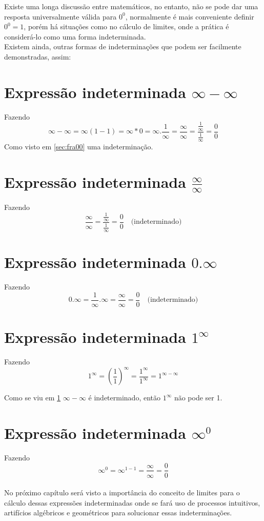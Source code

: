 Existe uma longa discussão entre matemáticos, no entanto, não se pode dar uma resposta universalmente válida para $0^0$, normalmente é mais conveniente definir $0^0 = 1$, porém há situações como no cálculo de limites, onde a prática é considerá-lo como uma forma indeterminada.\\

Existem ainda, outras formas de indeterminações que podem ser facilmente demonstradas, assim:
\section{Expressão indeterminada $\infty -  \infty$}
\label{sec:infinf}
Fazendo 
$$\infty - \infty = \infty (1-1) = \infty * 0 = \infty. \frac{1}{\infty} = \frac{\infty}{\infty} = \frac{\frac{1}{\infty}}{\frac{1}{\infty}} = \frac{0}{0}$$
Como visto em \ref{sec:fra00} uma indeterminação.
\section{Expressão indeterminada $\displaystyle  \frac{\infty}{\infty}$}
Fazendo 
$$
\frac{\infty}{\infty} = \frac{\frac{1}{\infty}}{\frac{1}{\infty}}  = \frac{0}{0} \quad \textrm{(indeterminado)}
$$

\section{Expressão indeterminada $0  . \infty$}
Fazendo 
$$
0 . \infty= \frac{1}{\infty} . \infty  = \frac{\infty}{\infty} = \frac{0}{0} \quad \textrm{(indeterminado)}
$$

\section{Expressão indeterminada $\displaystyle 1^\infty$}
Fazendo 
$$
1^\infty= (\frac{1}{1})^\infty   = \frac{1^\infty}{1^\infty} = 1^{\infty -\infty}
$$

Como se viu em \ref{sec:infinf} $\infty- \infty$ é indeterminado, então $1^\infty$ não pode ser 1.

\section{Expressão indeterminada $\displaystyle \infty^0$}
Fazendo 
$$
\infty^0 = \infty^{1-1} = \frac{\infty}{\infty} = \frac{0}{0}
$$\\



No próximo capítulo será  visto a importância do conceito de limites para o cálculo dessas expressões indeterminadas onde se fará uso de processos intuitivos, artifícios algébricos e geométricos para solucionar essas indeterminações.
